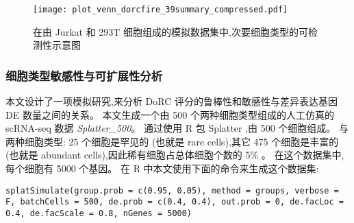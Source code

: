 \begin{figure}[!htbp]
    \centering
    \texttt{[image: plot\_venn\_dorcfire\_39summary\_compressed.pdf]}
    \caption{
    在由 Jurkat 和 293T 细胞组成的模拟数据集中,次要细胞类型的可检测性示意图
    }
    \label{fig:jurkat}
\end{figure}

\subsubsection{细胞类型敏感性与可扩展性分析}


本文设计了一项模拟研究,来分析 DoRC 评分的鲁棒性和敏感性与差异表达基因 DE 数量之间的关系。
本文生成一个由 500 个两种细胞类型组成的人工仿真的 scRNA-seq 数据 \textit{Splatter\_500}。
通过使用 R 包 Splatter ,由 500 个细胞组成。
与两种细胞类型: 25 个细胞是罕见的 (也就是 rare cells),其它 475 个细胞是丰富的 (也就是 abundant cells),因此稀有细胞占总体细胞个数的 5\% 。
在这个数据集中,每个细胞有 5000 个基因。
在 R 中本文使用下面的命令来生成这个数据集:

\texttt{splatSimulate(group.prob = c(0.95, 0.05), method = groups, 
verbose = F, batchCells = 500, de.prob = c(0.4, 0.4), out.prob = 0, 
de.facLoc = 0.4, de.facScale = 0.8, nGenes = 5000)}

